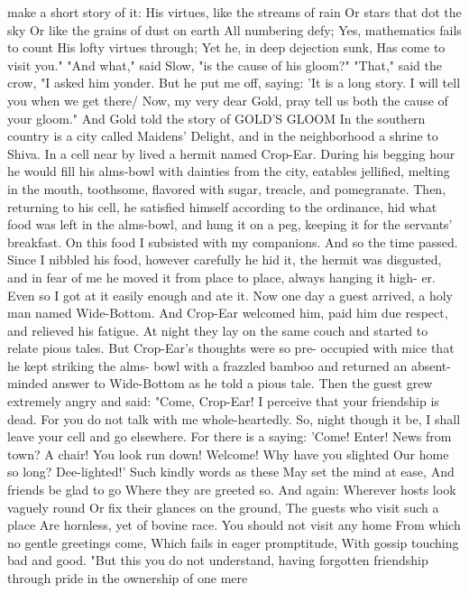 \documentclass{book}
\begin{document}
make a short story of it:
His virtues, like the streams of rain
Or stars that dot the sky
Or like the grains of dust on earth
All numbering defy;
Yes, mathematics fails to count
His lofty virtues through;
Yet he, in deep dejection sunk,
Has come to visit you."
"And what," said Slow, "is the cause of his
gloom?" "That," said the crow, "I asked him yonder.
But he put me off, saying: 'It is a long story. I will
tell you when we get there/ Now, my very dear Gold,
pray tell us both the cause of your gloom."
And Gold told the story of
GOLD'S GLOOM
In the southern country is a city called Maidens'
Delight, and in the neighborhood a shrine to Shiva.
In a cell near by lived a hermit named Crop-Ear.
During his begging hour he would fill his alms-bowl
with dainties from the city, eatables jellified, melting
in the mouth, toothsome, flavored with sugar, treacle,
and pomegranate. Then, returning to his cell, he
satisfied himself according to the ordinance, hid what
food was left in the alms-bowl, and hung it on a peg,
keeping it for the servants' breakfast. On this food
I subsisted with my companions. And so the time
passed.
Since I nibbled his food, however carefully he hid
it, the hermit was disgusted, and in fear of me he
moved it from place to place, always hanging it high-
er. Even so I got at it easily enough and ate it.
Now one day a guest arrived, a holy man named
Wide-Bottom. And Crop-Ear welcomed him, paid
him due respect, and relieved his fatigue. At night
they lay on the same couch and started to relate
pious tales. But Crop-Ear's thoughts were so pre-
occupied with mice that he kept striking the alms-
bowl with a frazzled bamboo and returned an absent-
minded answer to Wide-Bottom as he told a pious
tale.
Then the guest grew extremely angry and said:
"Come, Crop-Ear! I perceive that your friendship is
dead. For you do not talk with me whole-heartedly.
So, night though it be, I shall leave your cell and go
elsewhere. For there is a saying:
'Come! Enter! News from town?
A chair! You look run down!
Welcome! Why have you slighted
Our home so long? Dee-lighted!'
Such kindly words as these
May set the mind at ease,
And friends be glad to go
Where they are greeted so.
And again:
Wherever hosts look vaguely round
Or fix their glances on the ground,
The guests who visit such a place
Are hornless, yet of bovine race.
You should not visit any home
From which no gentle greetings come,
Which fails in eager promptitude,
With gossip touching bad and good.
"But this you do not understand, having forgotten
friendship through pride in the ownership of one mere
\end{document}
